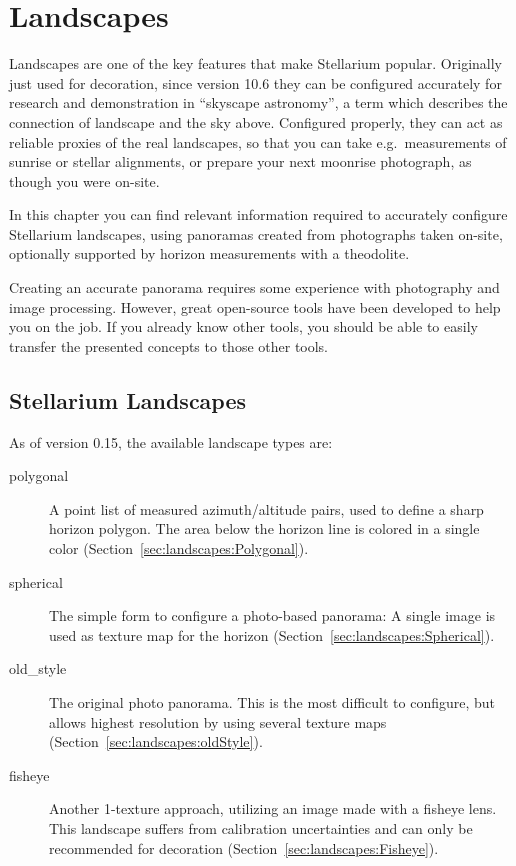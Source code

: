 
\chapter{Landscapes}
\label{ch:landscapes}

\newcommand{\landscape}[1]{\textsf{\textit{\footnotesize #1}}}

  
Landscapes are one of the key features that make Stellarium popular.
Originally just used for decoration, since version 10.6 they can be
configured accurately for research and demonstration in ``skyscape
astronomy'', a term which describes the connection of landscape and
the sky above. Configured properly, they can act as reliable proxies
of the real landscapes, so that you can take e.g.\ measurements of
sunrise or stellar alignments, or prepare your next moonrise
photograph, as though you were on-site.

In this chapter you can find relevant information required to
accurately configure Stellarium landscapes, using panoramas created
from photographs taken on-site, optionally supported by horizon
measurements with a theodolite.


Creating an accurate panorama requires some experience with
photography and image processing. However, great open-source tools
have been developed to help you on the job. If you already know other
tools, you should be able to easily transfer the presented concepts to
those other tools.


\section{Stellarium Landscapes}
\label{sec:landscapes:StellariumLandscapes}


As of version 0.15, the available landscape types are:
\begin{description}
\item[polygonal] A point list of measured azimuth/altitude pairs, used
  to define a sharp horizon polygon. The area below the horizon line
  is colored in a single color
  (Section~\ref{sec:landscapes:Polygonal}).
\item[spherical] The simple form to configure a photo-based panorama:
  A single image is used as texture map for the horizon
  (Section~\ref{sec:landscapes:Spherical}).
\item[old\_style] The original photo panorama. This is the most
  difficult to configure, but allows highest resolution by using
  several texture maps (Section~\ref{sec:landscapes:oldStyle}).
\item[fisheye] Another 1-texture approach, utilizing an image made
  with a fisheye lens. This landscape suffers from calibration
  uncertainties and can only be recommended for decoration
  (Section~\ref{sec:landscapes:Fisheye}).
\end{description}

